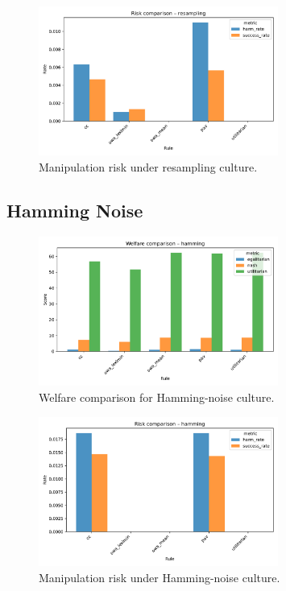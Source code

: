 \documentclass[11pt]{article}
\begin{document}
\begin{figure}[h!]
\centering
\includegraphics[width=0.7\textwidth]{figures/risk_comparison_resampling.pdf}
\caption{Manipulation risk under resampling culture.}
\end{figure}

\subsection{Hamming Noise}

\begin{figure}[h!]
\centering
\includegraphics[width=0.7\textwidth]{figures/welfare_comparison_hamming.pdf}
\caption{Welfare comparison for Hamming-noise culture.}
\end{figure}

\begin{figure}[h!]
\centering
\includegraphics[width=0.7\textwidth]{figures/risk_comparison_hamming.pdf}
\caption{Manipulation risk under Hamming-noise culture.}
\end{figure}
\end{document}
